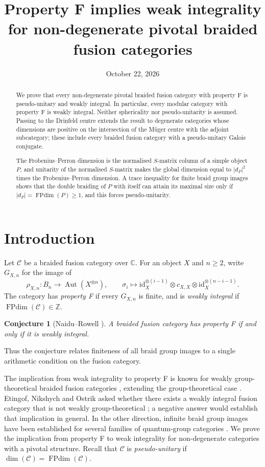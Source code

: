 \documentclass[11pt,oneside]{amsart}
\title[Property F implies weak integrality]{Property F implies weak integrality\\
for non-degenerate pivotal braided fusion categories}
\date{October 22, 2026}
\newtheorem*{conjecture}{Conjecture}
\theoremstyle{remark}
\newcommand{\C}{\mathcal C}
\newcommand{\FP}{\operatorname{FPdim}}
\newcommand{\Aut}{\operatorname{Aut}}
\newcommand{\id}{\mathrm{id}}
\newcommand{\Z}{\mathbb Z}
\begin{document}
\pagestyle{plain}

\begin{abstract}
We prove that every non-degenerate pivotal braided fusion category with
property F is pseudo-unitary and weakly integral. In particular, every modular
category with property F is weakly integral. Neither sphericality nor
pseudo-unitarity is assumed. Passing to the Drinfeld centre extends the result
to degenerate categories whose dimensions are positive on the intersection of
the M\"uger centre with the adjoint subcategory; these include every braided
fusion category with a pseudo-unitary Galois conjugate.

The Frobenius--Perron dimension is the normalised
$S$-matrix column of a simple object $P$, and unitarity of the normalised
$S$-matrix makes the global dimension equal to $|d_P|^2$ times the
Frobenius--Perron dimension. A trace inequality for finite braid group images
shows that the double braiding of $P$ with itself can attain its maximal size
only if $|d_P|=\FP(P)\ge1$, and this forces pseudo-unitarity.
\end{abstract}

\maketitle

\section{Introduction}

Let $\C$ be a braided fusion category over $\mathbb C$. For an object $X$ and
$n\ge2$, write $G_{X,n}$ for the image of
\[
\rho_{X,n}:B_n\longrightarrow\Aut(X^{\otimes n}),\qquad
\sigma_i\longmapsto\id_X^{\otimes(i-1)}\otimes c_{X,X}\otimes\id_X^{\otimes(n-i-1)}.
\]
The category has \emph{property F} if every $G_{X,n}$ is finite, and is
\emph{weakly integral} if $\FP(\C)\in\Z$.

\begin{conjecture}[Naidu--Rowell {\cite{NR}}]
A braided fusion category has property F if and only if it is weakly integral.
\end{conjecture}

Thus the conjecture relates finiteness of all braid group images to a single
arithmetic condition on the fusion category.

The implication from weak integrality to property F is known for weakly
group-theoretical braided fusion categories \cite[Theorem~7.2]{GN}, extending the
group-theoretical case \cite{ERW}. Etingof, Nikshych and Ostrik asked whether there
exists a weakly integral fusion category that is not weakly group-theoretical
\cite[Question~2]{ENO2}; a negative answer would establish that implication in
general. In the other direction, infinite braid group images have been
established for several families of quantum-group categories \cite{FLW,LRW}.
We prove the implication from property F to weak integrality for non-degenerate
categories with a pivotal structure. Recall that $\C$ is \emph{pseudo-unitary} if $\dim(\C)=\FP(\C)$.
\end{document}
